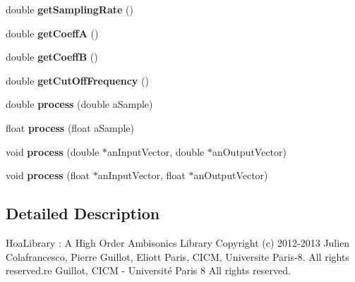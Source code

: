 \begin{DoxyCompactItemize}
\item 
\hypertarget{class_ambisonic_one_pole_af7df581cfa2eff69d5915e1599d30e7d}{double {\bfseries get\-Sampling\-Rate} ()}\label{class_ambisonic_one_pole_af7df581cfa2eff69d5915e1599d30e7d}

\item 
\hypertarget{class_ambisonic_one_pole_a0ba41d8f4b3b796381ccf6cae6d1e84b}{double {\bfseries get\-Coeff\-A} ()}\label{class_ambisonic_one_pole_a0ba41d8f4b3b796381ccf6cae6d1e84b}

\item 
\hypertarget{class_ambisonic_one_pole_a58d8f5c8750073642bab6ea9b6ab7407}{double {\bfseries get\-Coeff\-B} ()}\label{class_ambisonic_one_pole_a58d8f5c8750073642bab6ea9b6ab7407}

\item 
\hypertarget{class_ambisonic_one_pole_a24849fc2dacbaa771f5eda2fb17dc7b4}{double {\bfseries get\-Cut\-Off\-Frequency} ()}\label{class_ambisonic_one_pole_a24849fc2dacbaa771f5eda2fb17dc7b4}

\item 
\hypertarget{class_ambisonic_one_pole_ace0280e206dc58416397cf7880302131}{double {\bfseries process} (double a\-Sample)}\label{class_ambisonic_one_pole_ace0280e206dc58416397cf7880302131}

\item 
\hypertarget{class_ambisonic_one_pole_a40da92811bd0f8be3e277c615cf7dd32}{float {\bfseries process} (float a\-Sample)}\label{class_ambisonic_one_pole_a40da92811bd0f8be3e277c615cf7dd32}

\item 
\hypertarget{class_ambisonic_one_pole_af5a35d307cdeffbe0af66b4e4b94178f}{void {\bfseries process} (double $\ast$an\-Input\-Vector, double $\ast$an\-Output\-Vector)}\label{class_ambisonic_one_pole_af5a35d307cdeffbe0af66b4e4b94178f}

\item 
\hypertarget{class_ambisonic_one_pole_a575cf9391b07f65f52d570a2463b30ce}{void {\bfseries process} (float $\ast$an\-Input\-Vector, float $\ast$an\-Output\-Vector)}\label{class_ambisonic_one_pole_a575cf9391b07f65f52d570a2463b30ce}

\end{DoxyCompactItemize}


\subsection{Detailed Description}
Hoa\-Library \-: A High Order Ambisonics Library Copyright (c) 2012-\/2013 Julien Colafrancesco, Pierre Guillot, Eliott Paris, C\-I\-C\-M, Universite Paris-\/8. All rights reserved.\-re Guillot, C\-I\-C\-M -\/ Université Paris 8 All rights reserved.

